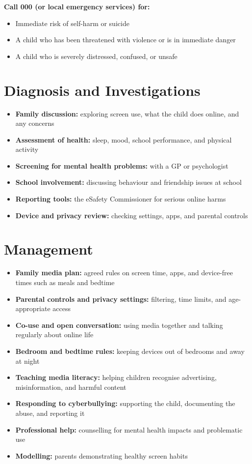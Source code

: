 \textbf{Call 000 (or local emergency services) for:}
\begin{itemize}
    \item Immediate risk of self-harm or suicide
    \item A child who has been threatened with violence or is in immediate danger
    \item A child who is severely distressed, confused, or unsafe
\end{itemize}

\section*{Diagnosis and Investigations}
\begin{itemize}
    \item \textbf{Family discussion:} exploring screen use, what the child does online, and any concerns
    \item \textbf{Assessment of health:} sleep, mood, school performance, and physical activity
    \item \textbf{Screening for mental health problems:} with a GP or psychologist
    \item \textbf{School involvement:} discussing behaviour and friendship issues at school
    \item \textbf{Reporting tools:} the eSafety Commissioner for serious online harms
    \item \textbf{Device and privacy review:} checking settings, apps, and parental controls
\end{itemize}

\section*{Management}
\begin{itemize}
    \item \textbf{Family media plan:} agreed rules on screen time, apps, and device-free times such as meals and bedtime
    \item \textbf{Parental controls and privacy settings:} filtering, time limits, and age-appropriate access
    \item \textbf{Co-use and open conversation:} using media together and talking regularly about online life
    \item \textbf{Bedroom and bedtime rules:} keeping devices out of bedrooms and away at night
    \item \textbf{Teaching media literacy:} helping children recognise advertising, misinformation, and harmful content
    \item \textbf{Responding to cyberbullying:} supporting the child, documenting the abuse, and reporting it
    \item \textbf{Professional help:} counselling for mental health impacts and problematic use
    \item \textbf{Modelling:} parents demonstrating healthy screen habits
\end{itemize}


